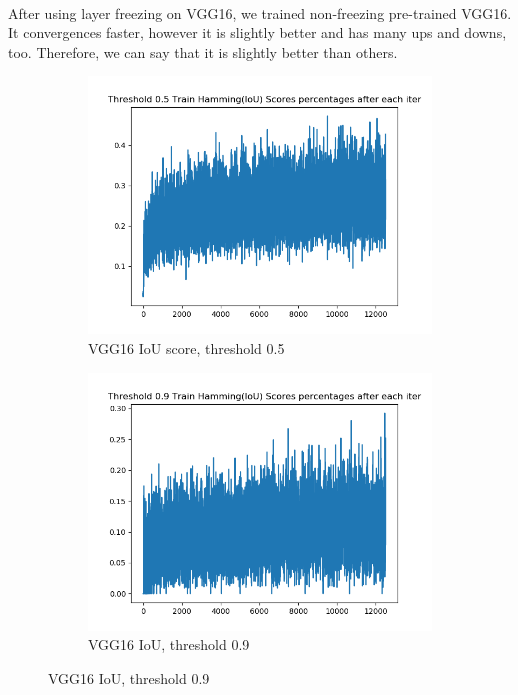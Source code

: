 \paragraph{}After using layer freezing on VGG16, we trained non-freezing pre-trained VGG16. It convergences faster, however it is slightly better and has many ups and downs, too. Therefore, we can say that it is slightly better than others.

\begin{figure}[!ht]
\centering
\begin{subfigure}{.5\textwidth}
	\centering
	\includegraphics[width=1\linewidth]{vgg16-full-lazy-1-train-scores-hs-5.png}
	\caption{\label{vgg16:vgg16-full-lazy-1-train-scores-hs-5}VGG16 IoU score, threshold 0.5}
\end{subfigure}%
\begin{subfigure}{.5\textwidth}
	\centering
	\includegraphics[width=1\linewidth]{vgg16-full-lazy-1-train-scores-hs-9.png}
	\caption{\label{vgg16:vgg16-full-lazy-1-train-scores-hs-9}VGG16 IoU, threshold 0.9}
\end{subfigure}
\end{figure}

